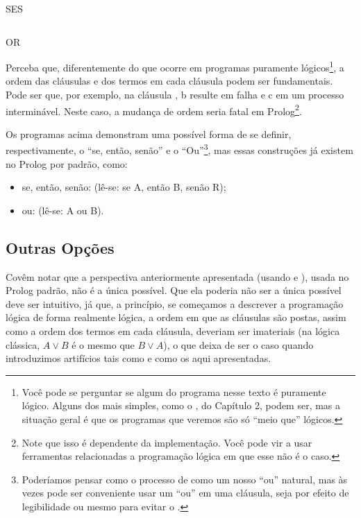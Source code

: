 \begin{listing}
  \inputminted{prolog}{../Exemplos/Cap4/prog4_ifthenelse.pl}
  \caption{SES}
\end{listing}

\begin{listing}
  \inputminted{prolog}{../Exemplos/Cap4/prog5_or.pl}
  \caption{OR}
\end{listing}

Perceba que, diferentemente do que ocorre em programas puramente
lógicos\footnote{Você pode se perguntar se algum do programa nesse
  texto é puramente lógico. Alguns dos mais simples, como o
  , do Capítulo 2, %
  podem ser, mas a situação geral é que os programas
  que veremos são só ``meio que'' lógicos.}, a ordem das cláusulas e
dos termos em cada cláusula podem ser fundamentais. Pode ser que, por
exemplo, na cláusula , b resulte em falha e c em
um processo interminável. Neste caso, a mudança de ordem seria
fatal em Prolog\footnote{Note que isso é dependente da implementação. Você pode
  vir a usar ferramentas relacionadas a programação lógica em que esse
  não é o caso.}.

Os programas acima demonstram uma possível forma de se definir,
respectivamente, o ``se, então, senão'' e o ``Ou''\footnote{Poderíamos pensar como o processo de
   como um nosso ``ou'' natural, mas às vezes
  pode ser conveniente usar um ``ou'' em uma cláusula, seja por efeito
  de legibilidade ou mesmo para evitar o .}, mas
essas construções já existem no Prolog por padrão, como:

\begin{itemize}
  \item se, então, senão:  (lê-se: se A, então
    B, senão R);
  \item ou:  (lê-se: A ou B).
\end{itemize}


\subsection{Outras Opções}

Covêm notar que a perspectiva anteriormente apresentada (usando
 e ), usada no
Prolog padrão, não é a única possível. Que ela poderia não ser a
única possível deve ser intuitivo, já que, a princípio, se começamos a
descrever a programação lógica de forma realmente lógica, a ordem em
que as cláusulas são postas, assim como a ordem dos termos em cada
cláusula, deveriam ser imateriais (na lógica clássica, $A \vee B$ é o
mesmo que $B \vee A$), o que deixa de ser o caso quando introduzimos
artifícios tais como  e
 como os aqui apresentadas.

